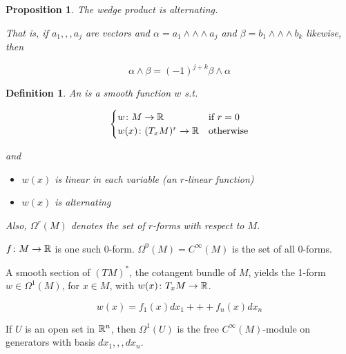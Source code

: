 \documentclass[11pt]{amsbook}
\theoremstyle{mystyle} %
\newtheorem{defi}[thm]{Definition}
\newtheorem{propo}[thm]{Proposition}
\numberwithin{thm}{section}
\begin{document}
\begin{propo}
	The wedge product is alternating.

	That is, if $a_1,,,a_j$ are vectors and $\alpha = a_1 \wedge\wedge\wedge a_j$ and $\beta = b_1 \wedge\wedge\wedge b_k$ likewise, then

	$$\alpha \wedge \beta = (-1)^{j+k} \beta \wedge \alpha$$
\end{propo}

\begin{defi}
	An  is a smooth function $w$ s.t.

	$$\begin{cases}
		w\colon M \to {\mathbb R} 	&\text{if $r = 0$} \\
		w(x)\colon (T_xM)^r \to {\mathbb R} 	&\text{otherwise} \\
	\end{cases}$$

	and

	\begin{itemize}
	  \item $w(x)$ is linear in each variable (an $r$-linear function)
	  \item $w(x)$ is alternating
	\end{itemize}

	Also, $\Omega^r(M)$ denotes the set of $r$-forms with respect to $M$.
\end{defi}

\begin{example}[0-form]
	$f\colon M \to {\mathbb R}$ is one such 0-form.
	$\Omega^0(M) = C^\infty(M)$ is the set of all 0-forms.
\end{example}

\begin{example}[1-form]
	A smooth section of $(TM)^*$, the cotangent bundle of $M$, yields the 1-form
	$w \in \Omega^1(M)$, for $x \in M$, with $w(x)\colon T_xM \to {\mathbb R}$.
\end{example}

\begin{example}[1-form]
	$$w(x) = f_1(x)dx_1 +++ f_n(x)dx_n$$
\end{example}

\begin{example}
	If $U$ is an open set in ${\mathbb R}^n$, then $\Omega^1(U)$ is the free $C^\infty(M)$-module on generators with basis ${dx_1,,,dx_n}$.
\end{example}
\end{document}
